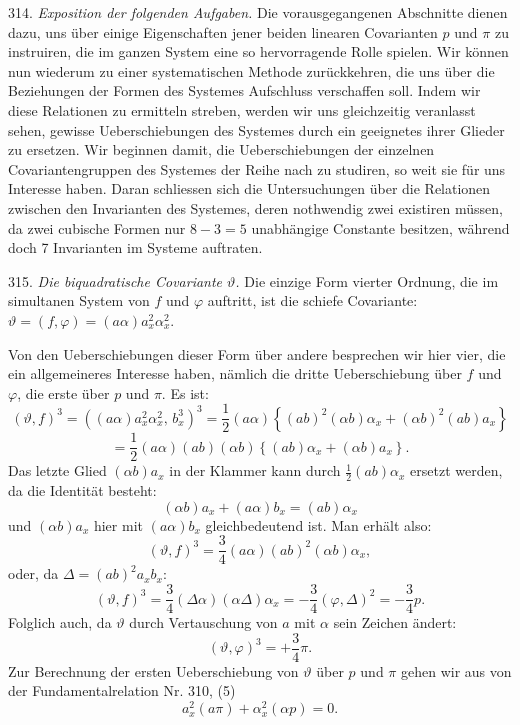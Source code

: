 \documentclass[11pt]{article}
\providecommand{\weberpage}[1]{}
\providecommand{\weq}[2]{\begin{equation}\tag{#1}#2\end{equation}}
\let\Delta\varDelta
\begin{document}
\weberpage{338}
314. \textit{Exposition der folgenden Aufgaben.} Die vorausgegangenen Abschnitte dienen dazu, uns über einige Eigenschaften jener beiden linearen Covarianten $p$ und $\pi$ zu instruiren, die im ganzen System eine so hervorragende Rolle spielen. Wir können nun wiederum zu einer systematischen Methode zurückkehren, die uns über die Beziehungen der Formen des Systemes Aufschluss verschaffen soll. Indem wir diese Relationen zu ermitteln streben, werden wir uns gleichzeitig veranlasst sehen, gewisse Ueberschiebungen des Systemes durch ein geeignetes ihrer Glieder zu ersetzen. Wir beginnen damit, die Ueberschiebungen der einzelnen Covariantengruppen des Systemes der Reihe nach zu studiren, so weit sie für uns Interesse haben. Daran schliessen sich die Untersuchungen über die Relationen zwischen den Invarianten des Systemes, deren nothwendig zwei existiren müssen, da zwei cubische Formen nur $8-3=5$ unabhängige Constante besitzen, während doch 7 Invarianten im Systeme auftraten.

315. \textit{Die biquadratische Covariante $\vartheta$.} Die einzige Form vierter Ordnung, die im simultanen System von $f$ und $\varphi$ auftritt, ist die schiefe Covariante: $\vartheta = (f,\varphi) = (a\alpha)a_x^2\alpha_x^2$.

Von den Ueberschiebungen dieser Form über andere besprechen wir hier vier, die ein allgemeineres Interesse haben, nämlich die dritte Ueberschiebung über $f$ und $\varphi$, die erste über $p$ und $\pi$. Es ist:
\[
(\vartheta,f)^3 = \left((a\alpha)a_x^2\alpha_x^2,\, b_x^3\right)^3 = \frac{1}{2}(a\alpha)\left\{(ab)^2(\alpha b)\alpha_x + (\alpha b)^2(ab)a_x\right\}
\]
\[
= \frac{1}{2}(a\alpha)(ab)(\alpha b)\left\{(ab)\alpha_x + (\alpha b)a_x\right\}.
\]
Das letzte Glied $(\alpha b)a_x$ in der Klammer kann durch $\frac{1}{2}(ab)\alpha_x$ ersetzt werden, da die Identität besteht:
\[
(\alpha b)a_x + (a\alpha)b_x = (ab)\alpha_x
\]
und $(\alpha b)a_x$ hier mit $(a\alpha)b_x$ gleichbedeutend ist. Man erhält also:
\[
(\vartheta,f)^3 = \frac{3}{4}(a\alpha)(ab)^2(\alpha b)\alpha_x,
\]
oder, da $\Delta = (ab)^2a_xb_x$:
\weq{1}{(\vartheta,f)^3 = \frac{3}{4}(\Delta\alpha)(\alpha\Delta)\alpha_x = -\frac{3}{4}(\varphi,\Delta)^2 = -\frac{3}{4}p.}
Folglich auch, da $\vartheta$ durch Vertauschung von $a$ mit $\alpha$ sein Zeichen ändert:
\[
(\vartheta,\varphi)^3 = +\frac{3}{4}\pi.
\]
Zur Berechnung der ersten Ueberschiebung von $\vartheta$ über $p$ und $\pi$ gehen wir aus von der Fundamentalrelation Nr. 310, (5)
\[
a_x^2(a\pi) + \alpha_x^2(\alpha p) = 0.
\]
\end{document}
